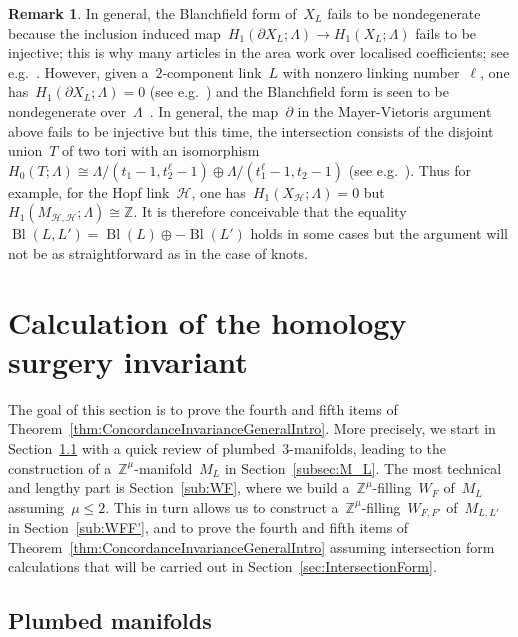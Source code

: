 \documentclass[10.9pt,a4paper]{amsart}
\theoremstyle{definition}
\newtheorem{remark}[theorem]{Remark}
\theoremstyle{remark}
\newcommand{\Z}{\mathbb{Z}}
\newcommand{\Bl}{\operatorname{Bl}}
\begin{document}
\begin{remark}
\label{rem:Bl-add}
In general,  the Blanchfield form of~$X_L$ fails to be nondegenerate because the inclusion induced map~$H_1(\partial X_L;\Lambda) \to H_1(X_L;\Lambda)$ fails to be injective; this is why many articles in the area work over localised coefficients; see e.g.~\cite{KimWhitney,BorodzikFriedlPowell,CFT18,ConwayBlanchfield}.
However, given a~$2$-component link~$L$ with nonzero linking number~$\ell$, one has~$H_1(\partial X_L;\Lambda)=0$ (see e.g.~\cite[Equation~(10)]{LevineModule2}) and the Blanchfield form is seen to be nondegenerate over~$\Lambda$~\cite[Introduction,~B]{LevineModule2}.
In general, the map~$\partial$ in the Mayer-Vietoris argument above fails to be injective but this time, the intersection consists of the disjoint union~$T$ of two tori with an isomorphism~$H_0(T;\Lambda) \cong \Lambda/(t_1-1,t_2^\ell-1) \oplus \Lambda/(t_1^\ell-1,t_2-1)$ (see e.g.~\cite[Equation (9)]{LevineModule2}).
Thus for example, for the Hopf link~$\mathcal{H}$, one has~$H_1(X_\mathcal{H};\Lambda)=0$ but~$H_1(M_{\mathcal{H},\mathcal{H}};\Lambda) \cong \Z$.
It is therefore conceivable that the equality $\Bl(L,L') =\Bl(L) \oplus -\Bl(L')$ holds in some cases but the argument will not be as straightforward as in the case of knots.
\end{remark}

\section{Calculation of the homology surgery invariant}
\label{sec:Fillings}

The goal of this section is to prove the fourth and fifth items of Theorem~\ref{thm:ConcordanceInvarianceGeneralIntro}.
More precisely, we start in Section~\ref{subsec:plumbedmanifolds} with a quick review of plumbed~$3$-manifolds,  leading to the construction of
a~$\Z^\mu$-manifold~$M_L$ in Section~\ref{subsec:M_L}.
The most technical and lengthy part is Section~\ref{sub:WF}, where we build a~$\Z^\mu$-filling~$W_F$ of~$M_L$ assuming~$\mu\le 2$. This in turn allows us to construct a~$\Z^\mu$-filling~$W_{F,F'}$ of~$M_{L,L'}$ in Section~\ref{sub:WFF'}, and to prove the fourth and fifth items of Theorem~\ref{thm:ConcordanceInvarianceGeneralIntro} assuming intersection form calculations that will be carried out in Section~\ref{sec:IntersectionForm}.


\subsection{Plumbed manifolds}
\label{subsec:plumbedmanifolds}
\end{document}
